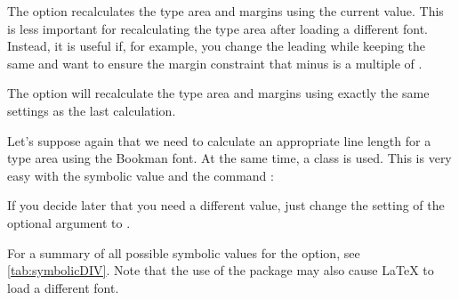 The option 
recalculates the type area and margins using the current  value. 
This is less important for recalculating the type area after loading a 
different font. Instead, it is useful if, for example, you change the
leading while keeping  the same and want to ensure the 
margin constraint that  minus  is a 
multiple of .

The option  will
recalculate the type area and margins using exactly the same settings as the
last calculation.

\begin{Example}
  Let's suppose again that we need to calculate an appropriate line length for
  a type area using the Bookman font. At the same time, a {\KOMAScript} class
  is used. This is very easy with the symbolic value  and the
  command :
If you decide later that you need a different  value, just change the
setting of the optional argument to .
\end{Example}

For a summary of all possible symbolic values for the  option, see
\autoref{tab:symbolicDIV}. Note that the use of the
 package may also cause \LaTeX{} to
load a different font.

\begin{table}
  \caption[{%
  	Symbolic values for the  option and the
  	 argument to %
  }]{%
    Available symbolic values for the  option or
    the  argument to
  }
  \label{tab:symbolicDIV}
  \begin{desctabular}
  \end{desctabular}
\end{table}

